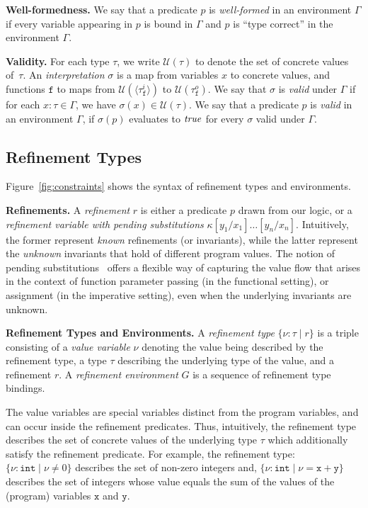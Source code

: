 \documentclass[nocopyrightspace]{sigplanconf}
\def\mypara#1{\smallskip\noindent\textbf{#1}}
\def\set#1{{\{ #1\}}}
\def\true{{\it true}}
\newcommand{\ttf}{\mathtt{f}}
\newcommand{\ttx}{\mathtt{x}}
\newcommand{\tty}{\mathtt{y}}
\def\zug#1{{\langle #1 \rangle}}
\def\valu{\nu}
\newcommand{\ftyp}[2]{{{#1}\!:\!{#2}}}
\newcommand{\SUBST}[3]{{#1}[{#3}/{#2}]}
\newcommand{\mybar}[1]{\zug{#1}}
\newcommand{\kvar}{\kappa}
\newcommand{\tenv}{\Gamma}
\newcommand{\renv}{G}
\newcommand{\univ}[1]{\mathcal{U}({#1})}
\def\ttint{\mathtt{int}}
\newcommand{\typ}{\tau}
\newcommand{\reftyp}[3]{\set{\ftyp{{#1}}{{#2}} \mid {#3}}}
\begin{document}
\mypara{Well-formedness.}
We say that a predicate $p$ is \emph{well-formed} in an environment
$\tenv$ if every variable appearing in $p$ is bound in $\tenv$ and
$p$ is ``type correct'' in the environment $\tenv$.

\mypara{Validity.}
For each type $\typ$, we write $\univ{\typ}$ to denote the set of
concrete values of~$\typ$.
An \emph{interpretation} $\sigma$ is a map from 
variables $x$ to concrete values, and 
functions $\ttf$ to maps from $\univ{\mybar{\typ^i_\ttf}}$ to $\univ{\typ^o_\ttf}$.
We say that $\sigma$ is \emph{valid} under $\tenv$ if 
for each $\ftyp{x}{\typ} \in \tenv$, we have $\sigma(x) \in \univ{\typ}$.
We say that a predicate $p$ is \emph{valid} in an environment $\tenv$, 
if $\sigma(p)$ evaluates to $\true$ for 
every $\sigma$ valid under $\tenv$. 

\subsection{Refinement Types}
\label{sec:reftypes}

Figure~\ref{fig:constraints} shows the syntax of refinement types and 
environments. 

\mypara{Refinements.}
A \emph{refinement} $r$ is either a predicate $p$ drawn from our logic,
or a \emph{refinement variable with pending substitutions}
$\SUBST{\kvar}{x_1}{y_1}\ldots\SUBST{}{x_n}{y_n}$. 
Intuitively, the former represent \emph{known} refinements (or invariants), 
while the latter represent the \emph{unknown} invariants that hold 
of different program values. 
The notion of pending substitutions~\cite{AbadiCardelliCurienLevy,Knowles07} offers a
flexible way of capturing the value flow that arises in the context of
function parameter passing (in the functional setting), or assignment 
(in the imperative setting), even when the underlying 
invariants are unknown.



\mypara{Refinement Types and Environments.}
A \emph{refinement type} $\reftyp{\valu}{\typ}{r}$ is a triple
consisting of a \emph{value variable} $\valu$ denoting the value being
described by the refinement type, a type $\typ$ describing the
underlying type of the value, and a refinement $r$. 
A \emph{refinement environment} $\renv$ is a sequence of refinement type
bindings.

The value variables are special variables distinct from the program
variables, and can occur inside the refinement predicates.
Thus, intuitively, the refinement type describes the set of
concrete values of the underlying type $\typ$ which additionally 
satisfy the refinement predicate. For example, the refinement type:
	$\reftyp{\valu}{\ttint}{\valu \not = 0}$
describes the set of non-zero integers and,
	$\reftyp{\valu}{\ttint}{\valu = \ttx + \tty}$
describes the set of integers whose value equals 
the sum of the values of the (program) variables $\ttx$ and $\tty$.
\end{document}
